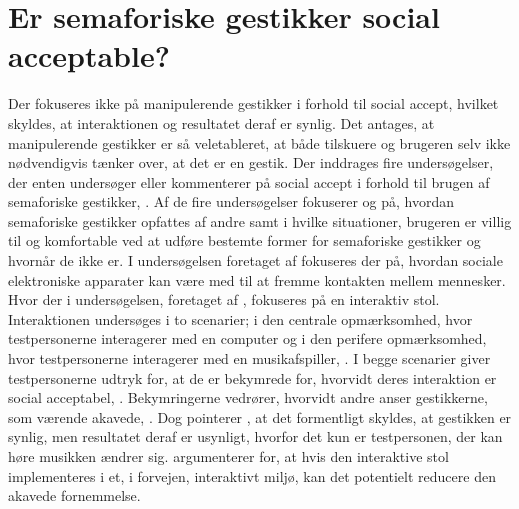 \section{Er semaforiske gestikker social acceptable?}
\label{Socialaccept}
%            
Der fokuseres ikke på manipulerende gestikker i forhold til social accept, hvilket skyldes, at interaktionen og resultatet deraf er synlig. Det antages, at manipulerende gestikker er så veletableret, at både tilskuere og brugeren selv ikke nødvendigvis tænker over, at det er en gestik. \blankline
%
Der inddrages fire undersøgelser, der enten undersøger eller kommenterer på social accept i forhold til brugen af semaforiske gestikker, \parencite{PDF:AChairAsUbiquitousInputDevice, PDF:WouldYouDoThat, PDF:AreYouComfortableDoingThat, PDF:AnExploratoryStudy}. Af de fire undersøgelser fokuserer \textcite{PDF:AreYouComfortableDoingThat} og \textcite{PDF:WouldYouDoThat} på, hvordan semaforiske gestikker opfattes af andre samt i hvilke situationer, brugeren er villig til og komfortable ved at udføre bestemte former for semaforiske gestikker og hvornår de ikke er. I undersøgelsen foretaget af \textcite{PDF:AnExploratoryStudy} fokuseres der på, hvordan sociale elektroniske apparater kan være med til at fremme kontakten mellem mennesker. Hvor der i undersøgelsen, foretaget af \textcite{PDF:AChairAsUbiquitousInputDevice}, fokuseres på en interaktiv stol. Interaktionen undersøges i to scenarier; i den centrale opmærksomhed, hvor testpersonerne interagerer med en computer og i den perifere opmærksomhed, hvor testpersonerne interagerer med en musikafspiller, \parencite{PDF:AChairAsUbiquitousInputDevice}. I begge scenarier giver testpersonerne udtryk for, at de er bekymrede for, hvorvidt deres interaktion er social acceptabel, \parencite[s. 8]{PDF:AChairAsUbiquitousInputDevice}. Bekymringerne vedrører, hvorvidt andre anser gestikkerne, som værende akavede, \parencite[s. 4]{PDF:AChairAsUbiquitousInputDevice}. Dog pointerer \textcite[s. 9]{PDF:AChairAsUbiquitousInputDevice}, at det formentligt skyldes, at gestikken er synlig, men resultatet deraf er usynligt, hvorfor det kun er testpersonen, der kan høre musikken ændrer sig. \textcite[s. 9]{PDF:AChairAsUbiquitousInputDevice} argumenterer for, at hvis den interaktive stol implementeres i et, i forvejen, interaktivt miljø, kan det potentielt reducere den akavede fornemmelse.\blankline
%
